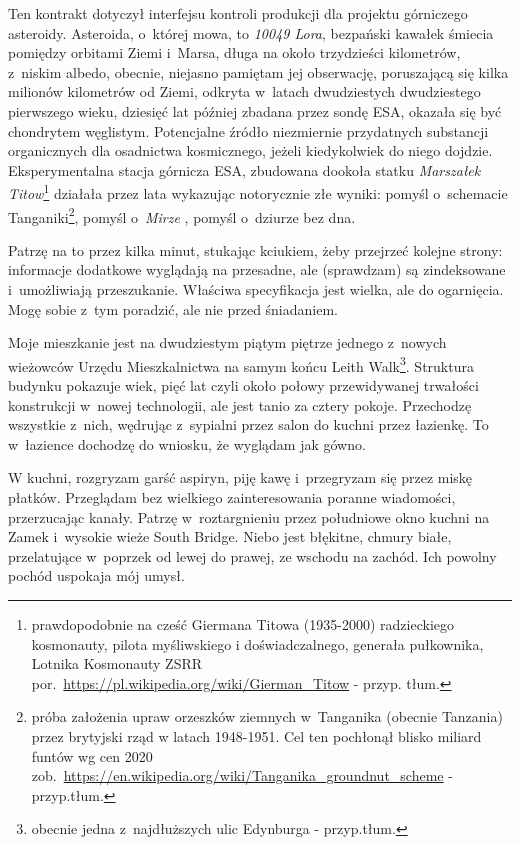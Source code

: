 \documentclass[oneside,polish,12pt,sfheadings]{mwbk}
\begin{document}
Ten kontrakt dotyczył interfejsu kontroli produkcji dla projektu
górniczego asteroidy. Asteroida, o~której mowa, to \emph{10049 Lora}, bezpański
kawałek śmiecia pomiędzy orbitami Ziemi i~Marsa, długa na około
trzydzieści kilometrów, z~niskim albedo, obecnie, niejasno pamiętam jej
obserwację, poruszającą się kilka milionów kilometrów od Ziemi, odkryta w~latach dwudziestych dwudziestego pierwszego wieku, dziesięć
lat później zbadana przez sondę ESA, okazała się być chondrytem
węglistym. Potencjalne źródło niezmiernie przydatnych substancji
organicznych dla osadnictwa kosmicznego, jeżeli kiedykolwiek do niego
dojdzie. Eksperymentalna stacja górnicza ESA, zbudowana dookoła statku
\emph{Marszałek Titow}\footnote{prawdopodobnie na cześć
Giermana Titowa (1935-2000) radzieckiego kosmonauty, pilota myśliwskiego
i doświadczalnego, generała pułkownika, Lotnika Kosmonauty ZSRR por.~\url{https://pl.wikipedia.org/wiki/Gierman_Titow} - przyp.
tłum.} działała przez lata wykazując notorycznie złe wyniki: pomyśl o~schemacie Tanganiki\footnote{próba założenia upraw
orzeszków ziemnych w~Tanganika (obecnie Tanzania) przez brytyjski rząd
w latach 1948-1951. Cel ten pochłonął blisko miliard funtów wg cen 2020
zob.~\url{https://en.wikipedia.org/wiki/Tanganika\_groundnut\_scheme} -
przyp.tłum.}, pomyśl o~\emph{Mirze} , pomyśl o~dziurze bez dna.

Patrzę na to przez kilka minut, stukając kciukiem, żeby przejrzeć
kolejne strony: informacje dodatkowe wyglądają na przesadne, ale
(sprawdzam) są zindeksowane i~umożliwiają przeszukanie. Właściwa
specyfikacja jest wielka, ale do ogarnięcia. Mogę sobie z~tym poradzić,
ale nie przed śniadaniem.

Moje mieszkanie jest na dwudziestym piątym piętrze jednego z~nowych
wieżowców Urzędu Mieszkalnictwa na samym końcu Leith
Walk\footnote{obecnie jedna z~najdłuższych ulic
Edynburga - przyp.tłum.}. Struktura budynku pokazuje wiek, pięć lat
czyli około połowy przewidywanej trwałości konstrukcji w~nowej
technologii, ale jest tanio za cztery pokoje. Przechodzę wszystkie z~nich, wędrując z~sypialni przez salon do kuchni przez łazienkę. To w~łazience dochodzę do wniosku, że wyglądam jak gówno.

W kuchni, rozgryzam garść aspiryn, piję kawę i~przegryzam się przez
miskę płatków. Przeglądam bez wielkiego zainteresowania poranne
wiadomości, przerzucając kanały. Patrzę w~roztargnieniu przez południowe
okno kuchni na Zamek i~wysokie wieże South Bridge. Niebo jest błękitne,
chmury białe, przelatujące w~poprzek od lewej do prawej, ze wschodu na
zachód. Ich powolny pochód uspokaja mój umysł.
\end{document}
